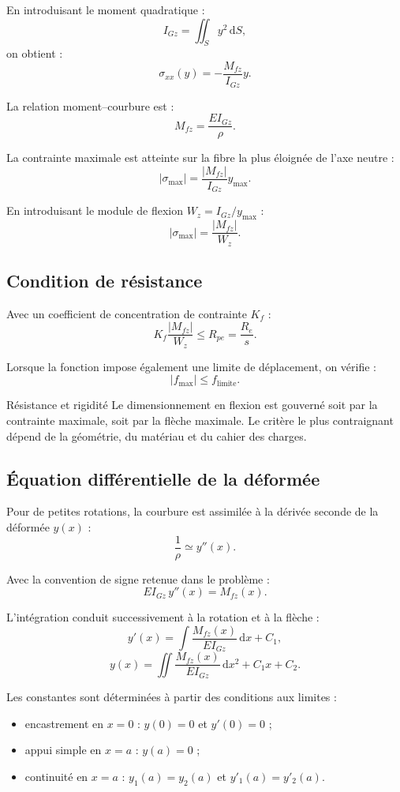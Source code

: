 En introduisant le moment quadratique :
\[
I_{Gz}=\iint_S y^2\,\mathrm dS,
\]
on obtient :
\[
\boxed{\sigma_{xx}(y)=-\frac{M_{fz}}{I_{Gz}}y.}
\]

La relation moment--courbure est :
\[
\boxed{M_{fz}=\frac{E I_{Gz}}{\rho}.}
\]

La contrainte maximale est atteinte sur la fibre la plus éloignée de l'axe neutre :
\[
|\sigma_{\max}|=\frac{|M_{fz}|}{I_{Gz}}y_{\max}.
\]

En introduisant le module de flexion $W_z=I_{Gz}/y_{\max}$ :
\[
\boxed{|\sigma_{\max}|=\frac{|M_{fz}|}{W_z}.}
\]

\subsection{Condition de résistance}

Avec un coefficient de concentration de contrainte $K_f$ :
\[
\boxed{K_f\frac{|M_{fz}|}{W_z}\leq R_{pe}=\frac{R_e}{s}.}
\]

Lorsque la fonction impose également une limite de déplacement, on vérifie :
\[
\boxed{|f_{\max}|\leq f_{\mathrm{limite}}.}
\]

\begin{TLWarning}{Résistance et rigidité}
Le dimensionnement en flexion est gouverné soit par la contrainte maximale, soit par la flèche maximale. Le critère le plus contraignant dépend de la géométrie, du matériau et du cahier des charges.
\end{TLWarning}

\subsection{Équation différentielle de la déformée}

Pour de petites rotations, la courbure est assimilée à la dérivée seconde de la déformée $y(x)$ :
\[
\frac{1}{\rho}\simeq y''(x).
\]

Avec la convention de signe retenue dans le problème :
\[
\boxed{E I_{Gz}\,y''(x)=M_{fz}(x).}
\]

L'intégration conduit successivement à la rotation et à la flèche :
\[
y'(x)=\int\frac{M_{fz}(x)}{EI_{Gz}}\,\mathrm dx+C_1,
\]
\[
y(x)=\iint\frac{M_{fz}(x)}{EI_{Gz}}\,\mathrm dx^2+C_1x+C_2.
\]

Les constantes sont déterminées à partir des conditions aux limites :
\begin{itemize}
  \item encastrement en $x=0$ : $y(0)=0$ et $y'(0)=0$ ;
  \item appui simple en $x=a$ : $y(a)=0$ ;
  \item continuité en $x=a$ : $y_1(a)=y_2(a)$ et $y'_1(a)=y'_2(a)$.
\end{itemize}

